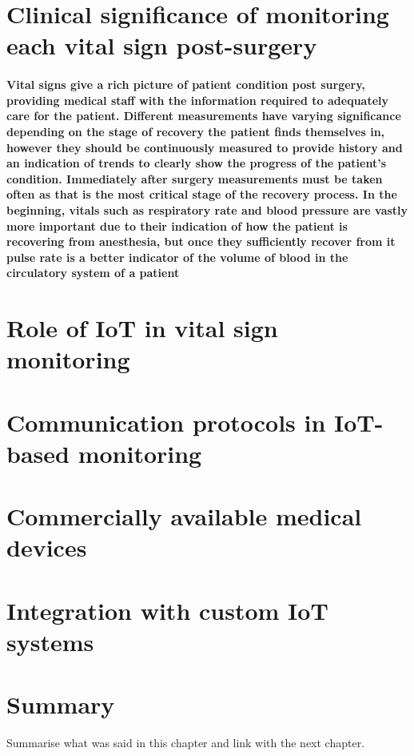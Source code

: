\section{Clinical significance of monitoring each vital sign post-surgery}
\paragraph{Vital signs give a rich picture of patient condition post surgery, providing medical staff with the information required to adequately care for the patient. Different measurements have varying significance depending on the stage of recovery the patient finds themselves in, however they should be continuously measured to provide history and an indication of trends to clearly show the progress of the patient's condition. Immediately after surgery measurements must be taken often as that is the most critical stage of the recovery process. In the beginning, vitals such as respiratory rate and blood pressure are vastly more important due to their indication of how the patient is recovering from anesthesia, but once they sufficiently recover from it pulse rate is a better indicator of the volume of blood in the circulatory system of a patient \cite{Surwit_Tam_2008}}

\paragraph{}

\section{Role of IoT in vital sign monitoring}
\section{Communication protocols in IoT-based monitoring}
\section{Commercially available medical devices}
\section{Integration with custom IoT systems}
\section{Summary}
Summarise what was said in this chapter and link with the next chapter.
